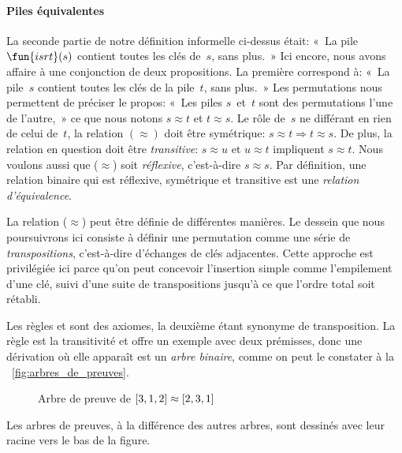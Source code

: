 \paragraph{Piles équivalentes}

La seconde partie de notre définition informelle ci-dessus était: «~La
pile \(\fun{isrt}(s)\) contient toutes les
clés de~\(s\), sans plus.~» Ici encore, nous avons affaire à une
conjonction de deux propositions. La première correspond à: «~La
pile~\(s\) contient toutes les clés de la pile~\(t\), sans plus.~» Les
permutations nous permettent de préciser le propos: «~Les piles
\(s\)~et~\(t\) sont des permutations l'une de l'autre,~» ce que nous
notons \(s \approx t\) et \(t \approx s\). Le rôle de~\(s\) ne
différant en rien de celui de~\(t\), la relation \((\approx)\) doit
être symétrique: \(s \approx t \Rightarrow t \approx s\). De plus, la
relation en question doit être \emph{transitive}: \(s \approx u\) et
\(u \approx t\) impliquent \(s \approx t\). Nous voulons aussi que
(\(\approx\)) soit \emph{réflexive}, c'est-à-dire \(s \approx s\). Par
définition, une relation binaire qui est réflexive, symétrique et
transitive est une \emph{relation
  d'équivalence}.

La relation (\(\approx\)) peut être définie de différentes
manières. Le dessein que nous poursuivrons ici consiste à définir une
permutation comme une série de
\emph{transpositions}, c'est-à-dire d'échanges de
clés adjacentes. Cette approche est privilégiée ici parce qu'on peut
concevoir l'insertion simple comme l'empilement d'une clé, suivi d'une
suite de transpositions jusqu'à ce que l'ordre total soit rétabli.
Les règles  et  sont des axiomes, la
deuxième étant synonyme de transposition. La règle  est
la transitivité et offre un exemple avec deux prémisses, donc une
dérivation où elle apparaît est un \emph{arbre
  binaire}, comme on peut le constater à la
\fig~\vref{fig:arbres_de_preuves}.
\begin{figure}[b]
\centering
{}
\qquad
{}
\caption{Arbre de preuve de \({[}3,1,2{]} \protect\approx
  {[}2,3,1{]}\)\label{fig:arbres_de_preuves}}
\end{figure}
Les arbres de preuves, à la différence
des autres arbres, sont dessinés avec leur racine vers le bas de la
figure.

